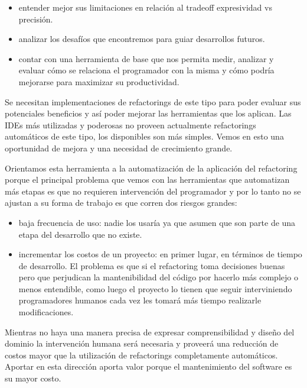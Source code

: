 \begin{itemize}
    \item entender mejor sus limitaciones en relación al tradeoff expresividad vs precisión.
    \item analizar los desafíos que encontremos para guiar desarrollos futuros.
    \item contar con una herramienta de base que nos permita medir, analizar y evaluar cómo se relaciona el programador
    con la misma y cómo podría mejorarse para maximizar su productividad.
\end{itemize}

Se necesitan implementaciones de refactorings de este tipo para poder evaluar sus potenciales
beneficios y así poder mejorar las herramientas que los aplican. Las IDEs más utilizadas y poderosas
no proveen actualmente refactorings automáticos de este tipo, los disponibles son más simples. Vemos
en esto una oportunidad de mejora y una necesidad de crecimiento grande.

Orientamos esta herramienta a la automatización de la aplicación del refactoring porque el principal
problema que vemos con las herramientas que automatizan más etapas es que no requieren intervención
del programador y por lo tanto no se ajustan a su forma de trabajo es que corren dos riesgos
grandes:

\begin{itemize}
    \item baja frecuencia de uso: nadie los usaría ya que asumen que son parte de una etapa del
    desarrollo que no existe.
    \item incrementar los costos de un proyecto: en primer lugar, en términos de tiempo de
    desarrollo. El problema es que si el refactoring toma decisiones buenas pero que perjudican la
    mantenibilidad del código por hacerlo más complejo o menos entendible, como luego el proyecto lo
    tienen que seguir interviniendo programadores humanos cada vez les tomará más tiempo realizarle
    modificaciones.
\end{itemize}

Mientras no haya una manera precisa de expresar comprensibilidad y diseño del dominio la
intervención humana será necesaria y proveerá una reducción de costos mayor que la utilización de
refactorings completamente automáticos. Aportar en esta dirección aporta valor porque el
mantenimiento del software es su mayor costo.



